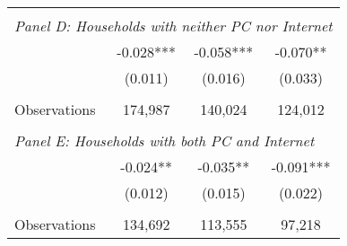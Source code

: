 {\begin{tabular}{lccc}
&  &  &   \\
\multicolumn{4}{l}{\textit{Panel D: Households with neither PC nor Internet}} \\
\hspace{3mm}        &      -0.028***&      -0.058***&      -0.070** \\
                    &     (0.011)   &     (0.016)   &     (0.033)   \\
                    &               &               &               \\
\hspace{3mm}Observations&     174,987   &     140,024   &     124,012   \\
 
&  &  &   \\
\multicolumn{4}{l}{\textit{Panel E: Households with both PC and Internet}} \\
\hspace{3mm}        &      -0.024** &      -0.035** &      -0.091***\\
                    &     (0.012)   &     (0.015)   &     (0.022)   \\
                    &               &               &               \\
\hspace{3mm}Observations&     134,692   &     113,555   &      97,218   \\
 

\bottomrule
\end{tabular}
}
